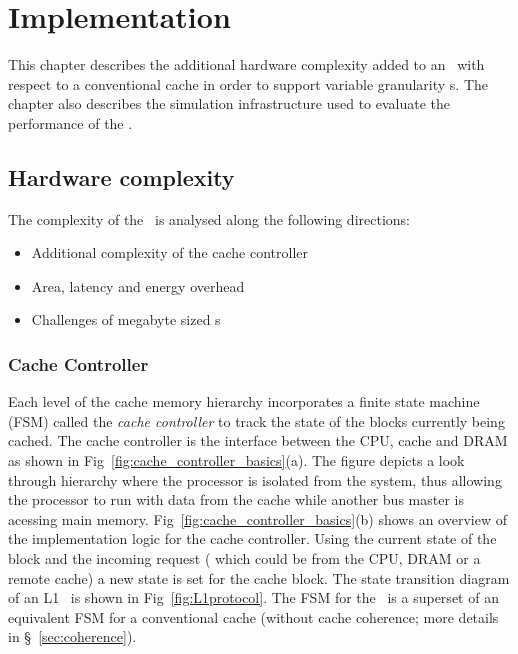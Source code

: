 
%
%

\chapter{Implementation}
\label{chap:hardware_complexity_and_simulation}

This chapter describes the additional hardware complexity added to an \AC\ with respect to a conventional cache in order to support variable granularity \AB{}s. The chapter also describes the simulation infrastructure used to evaluate the performance of the \AC{}.

\section{Hardware complexity}  
\label{sec:hardware_complexity}

The complexity of the \AC\ is analysed along the following directions:
\begin{itemize}
  \item Additional complexity of the cache controller
  \item Area, latency and energy overhead
  \item Challenges of megabyte sized \AC{}s
\end{itemize}


\subsection{Cache Controller} 

Each level of the cache memory hierarchy incorporates a finite state machine (FSM) called the \textit{cache controller} to track the state of the blocks currently being cached. The cache controller is the interface between the CPU, cache and DRAM as shown in Fig~\ref{fig:cache_controller_basics}(a). The figure depicts a look through hierarchy where the processor is isolated from the system, thus allowing the processor to run with data from the cache while another bus master is acessing main memory. Fig~\ref{fig:cache_controller_basics}(b) shows an overview of the implementation logic for the cache controller. Using the current state of the block and the incoming request ( which could be from the CPU, DRAM or a remote cache) a new state is set for the cache block. The state transition diagram of an L1 \AC\ is shown in Fig~\ref{fig:L1protocol}. The FSM for the \AC\ is a superset of an equivalent FSM for a conventional cache (without cache coherence; more details in \S~\ref{sec:coherence}).

